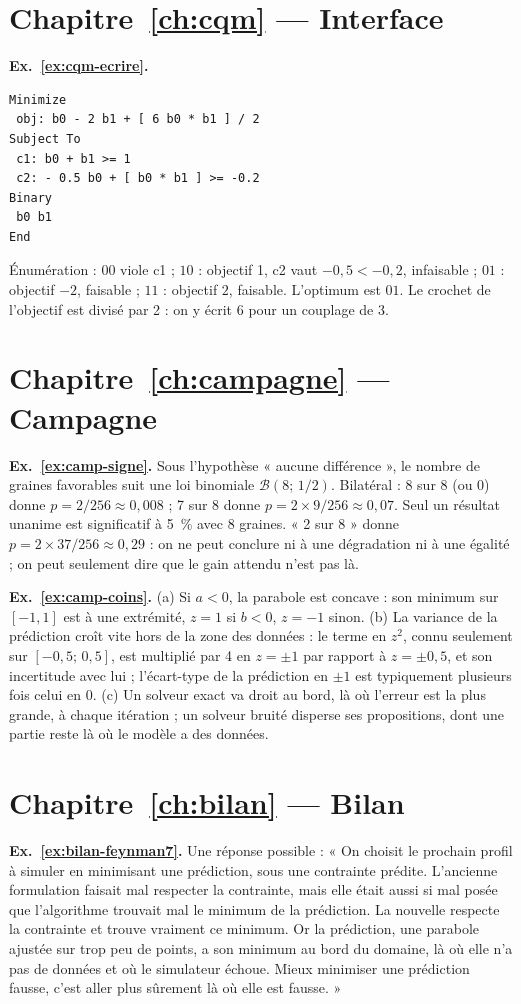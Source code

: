 \section*{Chapitre~\ref{ch:cqm} — Interface}
\textbf{Ex.~\ref{ex:cqm-ecrire}.}
\begin{lstlisting}[language={}]
Minimize
 obj: b0 - 2 b1 + [ 6 b0 * b1 ] / 2
Subject To
 c1: b0 + b1 >= 1
 c2: - 0.5 b0 + [ b0 * b1 ] >= -0.2
Binary
 b0 b1
End
\end{lstlisting}
Énumération : $00$ viole c1 ; $10$ : objectif 1, c2 vaut $-0{,}5<-0{,}2$, infaisable ; $01$ : objectif $-2$, faisable ; $11$ : objectif $2$, faisable. L'optimum est $01$. Le crochet de l'objectif est divisé par 2 : on y écrit $6$ pour un couplage de 3.

\section*{Chapitre~\ref{ch:campagne} — Campagne}
\textbf{Ex.~\ref{ex:camp-signe}.} Sous l'hypothèse « aucune différence », le nombre de graines favorables suit une loi binomiale $\mathcal B(8;\,1/2)$. Bilatéral : 8 sur 8 (ou 0) donne $p=2/256\approx0{,}008$ ; 7 sur 8 donne $p=2\times9/256\approx0{,}07$. Seul un résultat unanime est significatif à 5~\% avec 8 graines. « 2 sur 8 » donne $p=2\times37/256\approx0{,}29$ : on ne peut conclure ni à une dégradation ni à une égalité ; on peut seulement dire que le gain attendu n'est pas là.

\textbf{Ex.~\ref{ex:camp-coins}.} (a) Si $a<0$, la parabole est concave : son minimum sur $[-1,1]$ est à une extrémité, $z=1$ si $b<0$, $z=-1$ sinon. (b) La variance de la prédiction croît vite hors de la zone des données : le terme en $z^2$, connu seulement sur $[-0{,}5;\,0{,}5]$, est multiplié par 4 en $z=\pm1$ par rapport à $z=\pm0{,}5$, et son incertitude avec lui ; l'écart-type de la prédiction en $\pm1$ est typiquement plusieurs fois celui en 0. (c) Un solveur exact va droit au bord, là où l'erreur est la plus grande, à chaque itération ; un solveur bruité disperse ses propositions, dont une partie reste là où le modèle a des données.

\section*{Chapitre~\ref{ch:bilan} — Bilan}
\textbf{Ex.~\ref{ex:bilan-feynman7}.} Une réponse possible : « On choisit le prochain profil à simuler en minimisant une prédiction, sous une contrainte prédite. L'ancienne formulation faisait mal respecter la contrainte, mais elle était aussi si mal posée que l'algorithme trouvait mal le minimum de la prédiction. La nouvelle respecte la contrainte et trouve vraiment ce minimum. Or la prédiction, une parabole ajustée sur trop peu de points, a son minimum au bord du domaine, là où elle n'a pas de données et où le simulateur échoue. Mieux minimiser une prédiction fausse, c'est aller plus sûrement là où elle est fausse. »

